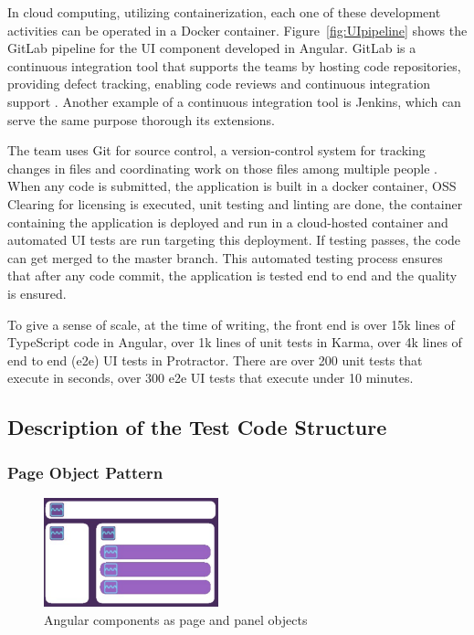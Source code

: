 \documentclass[conference]{IEEEtran}
\begin{document}
	In cloud computing, utilizing containerization, each one of these development activities can be operated in a Docker container.
	Figure~\ref{fig:UIpipeline} shows the GitLab pipeline for the UI component developed in Angular.
	GitLab is a continuous integration tool that supports the teams by hosting code repositories, providing defect tracking, enabling code reviews and continuous integration support \cite{wiki:gitlab}. 
	Another example of a continuous integration tool is Jenkins, which can serve the same purpose thorough its extensions.


	The team uses Git for source control, a version-control system for tracking changes in files and coordinating work on those files among multiple people \cite{wiki:git}. 
	When any code is submitted, the application is built in a docker container, OSS Clearing for licensing is executed, unit testing and linting are done, the container containing the application is deployed and run in a cloud-hosted container and automated UI tests are run targeting this deployment.
	If testing passes, the code can get merged to the master branch. 
	This automated testing process ensures that after any code commit, the application is tested end to end and the quality is ensured. 
	
	To give a sense of scale, at the time of writing, the front end is over 15k lines of TypeScript code in Angular, over 1k lines of unit tests in Karma, over 4k lines of end to end (e2e) UI tests in Protractor. 
	There are over 200 unit tests that execute in seconds, over 300 e2e UI tests that execute under 10 minutes. 


\subsection{Description of the Test Code Structure}

	\subsubsection{Page Object Pattern}

	\begin{figure}[!b]
		\includegraphics[width=0.45\textwidth,]{angular.pdf}
	\caption{Angular components as page and panel objects}
	\label{fig:angular}
	\end{figure}
\end{document}
